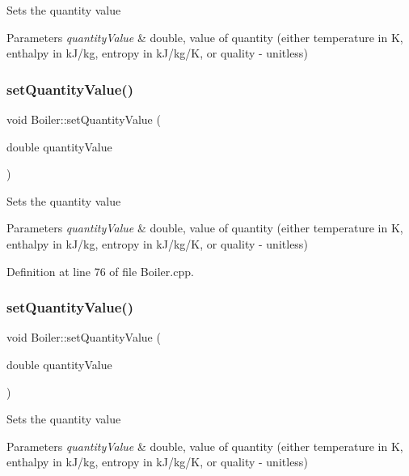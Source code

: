 Sets the quantity value 
\begin{DoxyParams}{Parameters}
{\em quantity\+Value} & double, value of quantity (either temperature in K, enthalpy in k\+J/kg, entropy in k\+J/kg/K, or quality -\/ unitless) \\
\hline
\end{DoxyParams}
\mbox{\label{class_boiler_ac3450d88dba124529d59baf62c39e14a}} 
\subsubsection{\texorpdfstring{set\+Quantity\+Value()}{setQuantityValue()}\hspace{0.1cm}{\footnotesize\ttfamily [2/3]}}
{\footnotesize\ttfamily void Boiler\+::set\+Quantity\+Value (\begin{DoxyParamCaption}\item[{double}]{quantity\+Value }\end{DoxyParamCaption})}

Sets the quantity value 
\begin{DoxyParams}{Parameters}
{\em quantity\+Value} & double, value of quantity (either temperature in K, enthalpy in k\+J/kg, entropy in k\+J/kg/K, or quality -\/ unitless) \\
\hline
\end{DoxyParams}


Definition at line 76 of file Boiler.\+cpp.

\mbox{\label{class_boiler_ac3450d88dba124529d59baf62c39e14a}} 
\subsubsection{\texorpdfstring{set\+Quantity\+Value()}{setQuantityValue()}\hspace{0.1cm}{\footnotesize\ttfamily [3/3]}}
{\footnotesize\ttfamily void Boiler\+::set\+Quantity\+Value (\begin{DoxyParamCaption}\item[{double}]{quantity\+Value }\end{DoxyParamCaption})}

Sets the quantity value 
\begin{DoxyParams}{Parameters}
{\em quantity\+Value} & double, value of quantity (either temperature in K, enthalpy in k\+J/kg, entropy in k\+J/kg/K, or quality -\/ unitless) \\
\hline
\end{DoxyParams}
\mbox{\label{class_boiler_ada7af5896a2a4701d78a532dc9bc9892}} 

